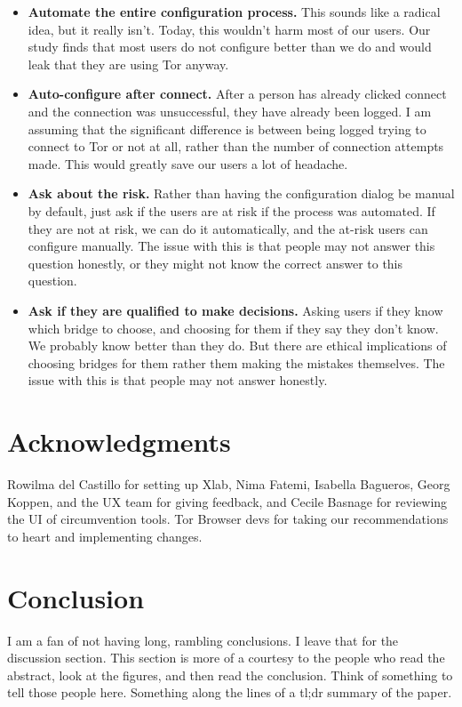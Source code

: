 \documentclass[USenglish,oneside,twocolumn]{article}
\begin{document}
\begin{itemize}
\item{\bfseries Automate the entire configuration process.} This sounds like a radical idea, but it really isn't. Today, this wouldn't harm most of our users. Our study finds that most users do not configure better than we do and would leak that they are using Tor anyway. 
\item {\bfseries Auto-configure after connect.} After a person has already clicked connect and the connection was unsuccessful, they have already been logged. I am assuming that the significant difference is between being logged trying to connect to Tor or not at all, rather than the number of connection attempts made. This would greatly save our users a lot of headache. 
\item{\bfseries Ask about the risk.} Rather than having the configuration dialog be manual by default, just ask if the users are at risk if the process was automated. If they are not at risk, we can do it automatically, and the at-risk users can configure manually. The issue with this is that people may not answer this question honestly, or they might not know the correct answer to this question. 
\item{\bfseries Ask if they are qualified to make decisions.} Asking users if they know which bridge to choose, and choosing for them if they say they don't know. We probably know better than they do. But there are ethical implications of choosing bridges for them rather them making the mistakes themselves. The issue with this is that people may not answer honestly. 
\end{itemize}

\section {Acknowledgments}
{\color {red} Rowilma del Castillo for setting up Xlab, Nima Fatemi, Isabella Bagueros, Georg Koppen, and the UX team for giving feedback, and Cecile Basnage for reviewing the UI of circumvention tools.} 
{\color {red} Tor Browser devs for taking our recommendations to heart and implementing changes.}

\section{Conclusion} 
{\color {red} I am a fan of not having long, rambling conclusions. I leave
that for the discussion section. This section is more of a courtesy to the 
people who read the abstract, look at the figures, and then read the 
conclusion. Think of something to tell those people here. Something along
the lines of a tl;dr summary of the paper.} 
\end{document}
